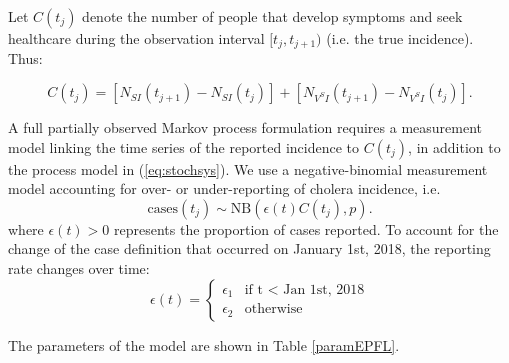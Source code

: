 Let \(C(t_j)\) denote the number of people that develop symptoms and seek healthcare during the
observation interval \([t_j, t_{j+1})\) (i.e. the true incidence). Thus:

\begin{equation}
    C(t_j) = [N_{SI}(t_{j+1}) - N_{SI}(t_j)] + [N_{V^SI}(t_{j+1}) - N_{V^SI}(t_j)].
\end{equation}

A full partially observed Markov process formulation requires a measurement model linking the time series of the reported incidence to \(C(t_j)\), in addition to the process model in (\eqref{eq:stochsys}). We use a negative-binomial measurement model accounting for over- or under-reporting of cholera incidence, i.e.
\[
	\text{cases}(t_j) \sim \text{NB}(\epsilon(t) C(t_j), p).
\]
where \(\epsilon(t) > 0\) represents the proportion of cases reported. To account for the change of the case definition that occurred on January 1st, 2018, the reporting rate changes over time:
\begin{equation}
\epsilon(t) = \left\{
    \begin{array}{ll}
        \epsilon_1 & \mbox{if t $<$ Jan 1st, 2018} \\
        \epsilon_2 & \mbox{otherwise}
    \end{array}
\right.
\end{equation}

The parameters of the model are shown in Table \ref{paramEPFL}.




